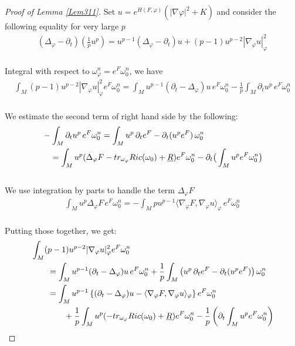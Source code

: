 \documentclass[11pt]{amsart}
\numberwithin{equation}{section}
\begin{document}
\begin{proof}[Proof of Lemma \ref{Lem311}]
Set $u=e^{H(F,\varphi)}(|\nabla\varphi|^2+K)$ and consider the following equality for very large $p$
\begin{align}
	(\Delta_\varphi-\partial_t)(\frac{1}{p}u^p) = u^{p-1}(\Delta_\varphi-\partial_t) u + (p-1)u^{p-2}|\nabla_\varphi u|^2_\varphi
\end{align}\\
Integral with respect to $ \omega_\varphi^n = e^{F} \omega_0^n $, we have
\begin{align}
	\int_M (p-1) u^{p-2} |\nabla_\varphi u|^2_\varphi e^{F} \omega_0^n
	= \int_M u^{p-1} (\partial_t - \Delta_\varphi) u \, e^{F} \omega_0^n 
	- \frac{1}{p} \int_M \partial_t u^p \, e^{F} \omega_0^n
\end{align}\\
We estimate the second term of right hand side by the following:
\begin{align}
	& -\int_M \partial_t u^p \, e^{F} \omega_0^n = \int_M u^p \, \partial_t e^{F} - \partial_t(u^p e^{F}) \, \omega_0^n \notag \\
	&\quad =  \int_M u^p (\Delta_\varphi F - tr_{\omega_{\varphi}} Ric(\omega_0) + \underline{R}) e^{F} \omega_0^n - \partial_t\big( \int_M u^p e^{F} \omega_0^n \big)
\end{align}\\
We use integration by parts to handle the term $ \Delta_\varphi F $
\begin{align}
	\int_M u^p \Delta_\varphi F \, e^{F} \omega_0^n = - \int_M p u^{p-1} \langle \nabla_\varphi F, \nabla_\varphi u \rangle_\varphi \, e^{F} \omega_0^n
\end{align}\\
Putting those together, we get:
\begin{align}
	&\int_M (p-1) u^{p-2} |\nabla_\varphi u|^2_\varphi e^{F} \omega_0^n \notag\\
	&\quad\quad =  \int_M u^{p-1} (\partial_t - \Delta_\varphi) u \, e^{F} \omega_0^n + \frac{1}{p}  \int_M \left( u^p \, \partial_t e^{F} - \partial_t(u^p e^{F}) \right) \omega_0^n  \notag \\
	&\quad\quad =  \int_M u^{p-1} \left\{ (\partial_t - \Delta_\varphi) u - \langle \nabla_\varphi F, \nabla_\varphi u \rangle_\varphi \right\} e^{F} \omega_0^n \notag\\
	& \quad\quad\quad\quad + \frac{1}{p}   \int_M u^p (-tr_{\omega_{\varphi }}Ric(\omega_0) + \underline{R}) e^{F} \omega_0^n - \frac{1}{p} \left(\partial_t \int_M u^p e^{F} \omega_0^n  \right)

\end{align}
\end{proof}
\end{document}
